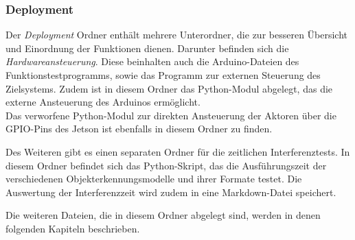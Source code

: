 \subsubsection{Deployment}

Der \textit{Deployment} Ordner enthält mehrere Unterordner, die zur besseren Übersicht und Einordnung der Funktionen dienen. Darunter befinden sich die \textit{Hardwareansteuerung}. Diese beinhalten auch die Arduino-Dateien des Funktionstestprogramms, sowie das Programm zur externen Steuerung des Zielsystems. Zudem ist in diesem Ordner das Python-Modul abgelegt, das die externe Ansteuerung des Arduinos ermöglicht.
\\
Das verworfene Python-Modul zur direkten Ansteuerung der Aktoren über die \ac{GPIO}-Pins des Jetson ist ebenfalls in diesem Ordner zu finden.

Des Weiteren gibt es einen separaten Ordner für die zeitlichen Interferenztests. In diesem Ordner befindet sich das Python-Skript, das die Ausführungszeit der verschiedenen Objekterkennungsmodelle und ihrer Formate testet. Die Auswertung der Interferenzzeit wird zudem in eine Markdown-Datei speichert.

Die weiteren Dateien, die in diesem Ordner abgelegt sind, werden in denen folgenden Kapiteln beschrieben.

